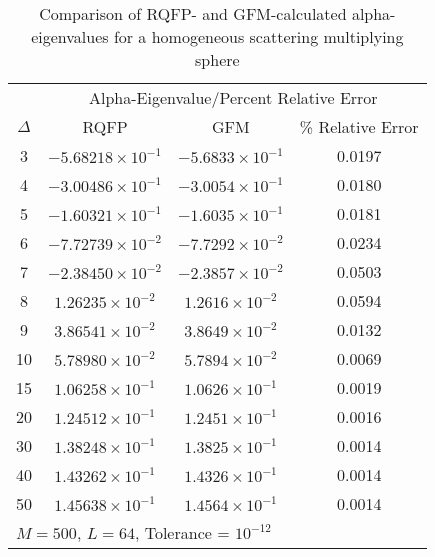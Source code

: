 \begin{table*}[h]
\centering{}
\caption{Comparison of RQFP- and GFM-calculated alpha-eigenvalues for a homogeneous scattering multiplying sphere}
\label{table:CompHomogMultSphere}
\begin{tabular}{@{}cccc@{}}\toprule
& \multicolumn{3}{c}{Alpha-Eigenvalue/Percent Relative Error} \\
\cmidrule{2-4} $\Delta$ & RQFP & GFM & \% Relative Error \\
\midrule
3 & $-5.68218 \times 10^{-1}$ & $-5.6833 \times 10^{-1}$ & 0.0197 \\ 
4 & $-3.00486 \times 10^{-1}$ & $-3.0054 \times 10^{-1}$ & 0.0180 \\ 
5 & $ -1.60321 \times 10^{-1}$ & $-1.6035 \times 10^{-1}$ & 0.0181 \\ 
6 & $ -7.72739 \times 10^{-2}$ & $-7.7292 \times 10^{-2}$ & 0.0234 \\ 
7 & $-2.38450 \times 10^{-2}$ & $-2.3857 \times 10^{-2}$ & 0.0503 \\ 
8 & $1.26235 \times 10^{-2}$ & $1.2616 \times 10^{-2}$ & 0.0594 \\ 
9 & $ 3.86541 \times 10^{-2}$ & $3.8649 \times 10^{-2}$ & 0.0132 \\ 
10 & $5.78980 \times 10^{-2}$ & $5.7894 \times 10^{-2}$ & 0.0069 \\ 
15 & $1.06258 \times 10^{-1}$ & $1.0626 \times 10^{-1}$ & 0.0019 \\ 
20 & $1.24512 \times 10^{-1}$ & $1.2451 \times 10^{-1}$ &  0.0016 \\ 
30 & $1.38248 \times 10^{-1}$ & $1.3825 \times 10^{-1}$ &  0.0014 \\ 
40 & $1.43262 \times 10^{-1}$ & $1.4326 \times 10^{-1}$ &  0.0014 \\ 
50 & $1.45638 \times 10^{-1}$ & $1.4564 \times 10^{-1}$ &  0.0014 \\ 
\bottomrule
\multicolumn{4}{l}{$M = 500$, $L = 64$, Tolerance = $10^{-12}$} \\
\end{tabular}
\end{table*}

